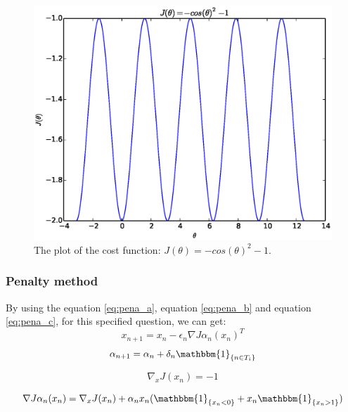 \documentclass[a4paper,12pt]{article}
\begin{document}
\begin{figure}[H]
\begin{center}
\includegraphics[width=1.0\linewidth]{line_sphe.eps}


\end{center}
   \caption{The plot of the cost function: $J(\theta) = -cos(\theta)^2-1$. }
\label{fig:line_cost_sphe}
\end{figure}


\subsubsection{Penalty method }
 By using the equation \ref{eq:pena_a}, equation \ref{eq:pena_b} and equation \ref{eq:pena_c}, for this specified question, we can get:\\
\begin{equation} \label{eq:pena_line_a}
x_{n+1}=x_n-\epsilon _n \nabla J{\alpha_ n}(x_n)^T
\end{equation}
\begin{equation}\label{eq:pena_line_b}
\alpha_{n+1}=\alpha_n+\delta _n \mathbbm{1} _{\{n\in {T_i}\}}
\end{equation}

\begin{equation}\label{eq:pena_line_c}
\nabla _x J(x_n) = -1
\end{equation}

\begin{equation}\label{eq:pena_line_d}
\nabla J{\alpha_ n}(x_n) =\nabla _x J(x_n)+\alpha_n x_n( \mathbbm{1}_{\{x_n<0\}}+ x_n \mathbbm{1}_{\{x_n>1\}})
\end{equation}
\end{document}
